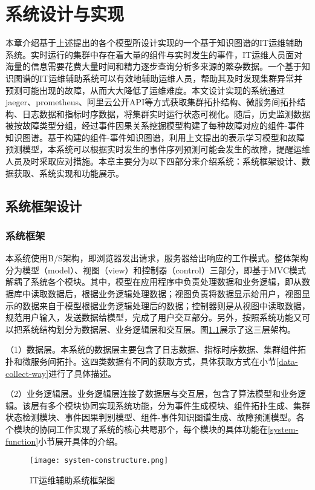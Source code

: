 \chapter{系统设计与实现}
本章介绍基于上述提出的各个模型所设计实现的一个基于知识图谱的IT运维辅助系统。实时运行的集群中存在着大量的组件与实时发生的事件，IT运维人员面对海量的信息需要花费大量时间和精力逐步查询分析多来源的繁杂数据。一个基于知识图谱的IT运维辅助系统可以有效地辅助运维人员，帮助其及时发现集群异常并预测可能出现的故障，从而大大降低了运维难度。本文设计实现的系统通过jaeger、prometheus、阿里云公开API等方式获取集群拓扑结构、微服务间拓扑结构、日志数据和指标时序数据，将集群实时运行状态可视化。随后，历史监测数据被按故障类型分组，经过事件因果关系挖掘模型构建了每种故障对应的组件-事件知识图谱。基于构建的组件-事件知识图谱，利用上文提出的表示学习模型和故障预测模型，本系统可以根据实时发生的事件序列预测可能会发生的故障，提醒运维人员及时采取应对措施。本章主要分为以下四部分来介绍系统：系统框架设计、数据获取、系统实现和功能展示。
\section{系统框架设计}
\subsection{系统框架}
本系统使用B/S架构，即浏览器发出请求，服务器给出响应的工作模式。整体架构分为模型（model）、视图（view）和控制器（control）三部分，即基于MVC模式解耦了系统各个模块。其中，模型在应用程序中负责处理数据和业务逻辑，即从数据库中读取数据后，根据业务逻辑处理数据；视图负责将数据显示给用户，视图显示的数据来自于模型根据业务逻辑处理后的数据；控制器则是从视图中读取数据，规范用户输入，发送数据给模型，完成了用户交互部分。另外，按照系统功能又可以把系统结构划分为数据层、业务逻辑层和交互层。图\ref{system-constructure}展示了这三层架构。

（1）数据层。本系统的数据层主要包含了日志数据、指标时序数据、集群组件拓扑和微服务间拓扑。这四类数据有不同的获取方式，具体获取方式在小节\ref{data-collect-way}进行了具体描述。

（2）业务逻辑层。业务逻辑层连接了数据层与交互层，包含了算法模型和业务逻辑。该层有多个模块协同实现系统功能，分为事件生成模块、组件拓扑生成、集群状态检测模块、事件因果判别模型、组件-事件知识图谱生成、故障预测模型。各个模块的协同工作实现了系统的核心共嗯那个，每个模块的具体功能在\ref{system-function}小节展开具体的介绍。
\begin{figure}[htbp]
    \centering
    \texttt{[image: system-constructure.png]}
    \caption{IT运维辅助系统框架图\label{system-constructure}}
\end{figure}

